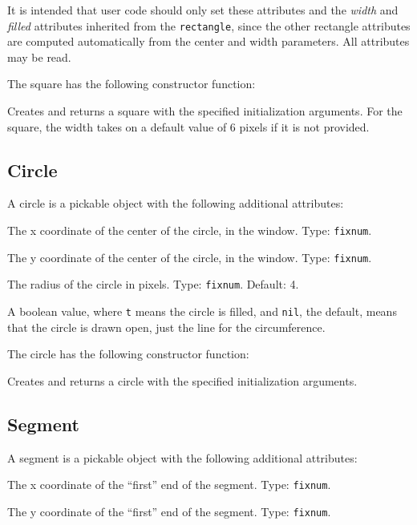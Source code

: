 \documentclass[twoside,openright,11pt]{report}
\newcommand{\tp}[1]{\texttt{#1}}
\begin{document}
It is intended that user code should only set these attributes and the
\emph{width} and \emph{filled} attributes inherited from the
\tp{rectangle}, since the other rectangle attributes are computed
automatically from the center and width parameters.  All attributes
may be read.

The square has the following constructor function:

{Creates and returns a square with the specified initialization
arguments.  For the square, the width takes on a default value of 6
pixels if it is not provided.}

\subsection{Circle}

A circle is a pickable object with the following
additional attributes:

{The x coordinate of the center of the circle, in the window.  Type:
\tp{fixnum}.}

{The y coordinate of the center of the circle, in the window.  Type:
\tp{fixnum}.}

{The radius of the circle in pixels.  Type: \tp{fixnum}.  Default:
4.}

{A boolean value, where \tp{t} means the circle is filled, and
\tp{nil}, the default, means that the circle is drawn open, just
the line for the circumference.}

The circle has the following constructor function:

{Creates and returns a circle with the specified initialization
arguments.}

\subsection{Segment}

A segment is a pickable object with the following
additional attributes:

{The x coordinate of the ``first'' end of the segment.  Type:
\tp{fixnum}.}

{The y coordinate of the ``first'' end of the segment.  Type:
\tp{fixnum}.}
\end{document}
